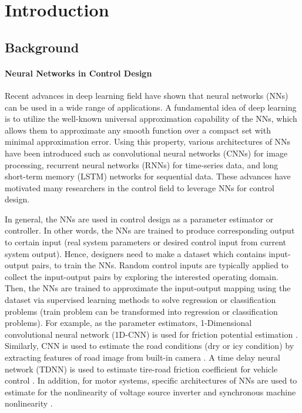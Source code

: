 

\chapter{Introduction}

\section{Background} 

\subsubsection{Neural Networks in Control Design}

Recent advances in deep learning field have shown that neural networks (NNs) can be used in a wide range of applications. 
A fundamental idea of deep learning is to utilize the well-known universal approximation capability of the NNs, which allows them to approximate any smooth function over a compact set with minimal approximation error. 
Using this property, various architectures of NNs have been introduced such as convolutional neural networks (CNNs) for image processing, recurrent neural networks (RNNs) for time-series data, and long short-term memory (LSTM) networks for sequential data. 
These advances have motivated many researchers in the control field to leverage NNs for control design.
 
In general, the NNs are used in control design as a parameter estimator or controller.
In other words, the NNs are trained to produce corresponding output to certain input (\eg real system parameters or desired control input from current system output).
Hence, designers need to make a dataset which contains input-output pairs, to train the NNs.
Random control inputs are typically applied to collect the input-output pairs by exploring the interested operating domain.
Then, the NNs are trained to approximate the input-output mapping using the dataset via supervised learning methods to solve regression or classification problems (\ie train problem can be transformed into regression or classification problems).
For example, as the parameter estimators, 1-Dimensional convolutional neural network (1D-CNN) is used for friction potential estimation \cite{RN109}.
Similarly, CNN is used to estimate the road conditions (\eg dry or icy condition) by extracting features of road image from built-in camera \cite{RN118}.
A time delay neural network (TDNN) is used to estimate tire-road friction coefficient for vehicle control \cite{RN107}.
In addition, for motor systems, specific architectures of NNs are used to estimate for the nonlinearity of voltage source inverter and synchronous machine nonlinearity \cite{RN115}.

